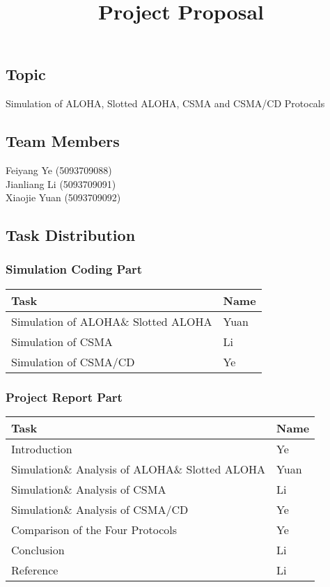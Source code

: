 \documentclass{article}
\begin{document}
\title{Project Proposal}
\maketitle
\subsection*{Topic}
Simulation of ALOHA, Slotted ALOHA, CSMA and CSMA/CD Protocals

\subsection*{Team Members}
Feiyang Ye (5093709088) \\
Jianliang Li (5093709091) \\
Xiaojie Yuan (5093709092)

\subsection*{Task Distribution}
\subsubsection*{Simulation Coding Part}
\begin{table}[htbp]
\begin{tabular}{ll}
\toprule
Task & Name \\
\midrule
Simulation of ALOHA\& Slotted ALOHA & Yuan \\
Simulation of CSMA & Li \\
Simulation of CSMA/CD & Ye \\
\bottomrule
\end{tabular}
\end{table}

\subsubsection*{Project Report Part}
\begin{table}[htbp]
\begin{tabular}{ll}
\toprule
Task & Name \\
\midrule
Introduction & Ye \\
Simulation\& Analysis of ALOHA\& Slotted ALOHA & Yuan \\
Simulation\& Analysis of CSMA & Li \\
Simulation\& Analysis of CSMA/CD & Ye \\
Comparison of the Four Protocols & Ye \\ 
Conclusion & Li \\
Reference & Li \\
\bottomrule
\end{tabular}
\end{table}
\end{document}

